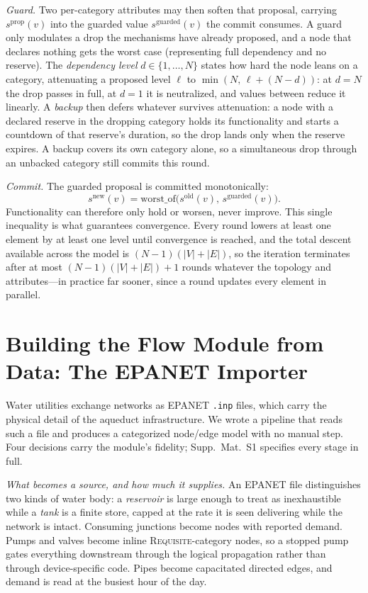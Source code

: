 \documentclass{svproc}
\newcommand{\worstof}{\mathrm{worst\_of}}
\begin{document}
  \emph{Guard.} Two per-category attributes may then soften that proposal, carrying
  $s^{\mathrm{prop}}(v)$ into the guarded value $s^{\mathrm{guarded}}(v)$ the commit
  consumes. A guard only modulates a drop the mechanisms have already proposed,
  and a node that declares nothing gets the worst case (representing full dependency and no
  reserve). The \emph{dependency level} $d\in\{1,\ldots,N\}$ states how hard the node
  leans on a category, attenuating a proposed level $\ell$ to $\min(N,\,\ell+(N-d))$: at
  $d=N$ the drop passes in full, at $d=1$ it is neutralized, and values between reduce it
  linearly. A \emph{backup} then defers whatever survives attenuation: a node with a declared reserve
  in the dropping category holds its functionality and starts a countdown of that
  reserve's duration, so the drop lands only when the reserve expires. A backup covers its
  own category alone, so a simultaneous drop through an unbacked category still commits
  this round.

  \emph{Commit.} The guarded proposal is committed monotonically:
  \[
    s^{\mathrm{new}}(v) = \worstof\big(s^{\mathrm{old}}(v),\, s^{\mathrm{guarded}}(v)\big).
  \]
  Functionality can therefore only hold or worsen, never improve. This single inequality
  is what guarantees convergence.
  Every round lowers at least one element by at least one level until convergence is reached, and
  the total descent available across the model is $(N-1)(|V|+|E|)$, so the iteration
  terminates after at most $(N-1)(|V|+|E|)+1$ rounds whatever the topology and attributes---in
  practice far sooner, since a round updates every element in parallel.

  \section{Building the Flow Module from Data: The EPANET Importer}\label{sec:importer}

  Water utilities exchange networks as EPANET \texttt{.inp} files, which carry the
  physical detail of the aqueduct infrastructure. We wrote a pipeline that reads
  such a file and produces a categorized node/edge model with no manual step. Four
  decisions carry the module's fidelity; Supp.~Mat.~S1 specifies every stage in full.

  \emph{What becomes a source, and how much it supplies.} An EPANET file distinguishes two kinds
  of water body: a \emph{reservoir} is large enough to treat as inexhaustible while a \emph{tank} is a
  finite store, capped at the rate it is seen delivering while the network is intact.
  Consuming junctions become nodes with reported demand. Pumps and valves
  become inline \textsc{Requisite}-category nodes, so a stopped pump gates everything downstream
  through the logical propagation rather than through device-specific code. Pipes become
  capacitated directed edges, and demand is read at the busiest hour of the day.
\end{document}
